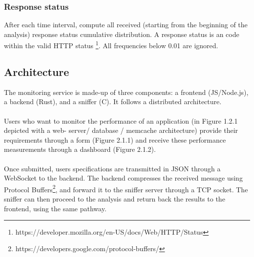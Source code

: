 \documentclass[12pt,hidelinks]{article}
\begin{document}
\subsubsection{Response status}

After each time interval, compute all received (starting from the beginning of the analysis) response status cumulative distribution. 
A response status is an code within the valid HTTP status \footnote{https://developer.mozilla.org/en-US/docs/Web/HTTP/Status}. All frequencies below 0.01 are ignored.


\subsection{Architecture}
	The monitoring service is made-up of three components: a frontend (JS/Node.js), a backend (Rust), and a sniffer (C). It follows a distributed architecture. \\
	\\
	Users who want to monitor the performance of an application (in Figure 1.2.1 depicted with a web-
	server/ database / memcache architecture) provide their requirements through a form (Figure 2.1.1) and 
	receive these performance measurements through a dashboard (Figure 2.1.2).  \\
	\\
	Once submitted, users specifications are transmitted in JSON through a WebSocket to the backend.
	The backend compresses the received message using Protocol Buffers\footnote{https://developers.google.com/protocol-buffers/}, and forward it to the sniffer server through a TCP socket.
	The sniffer can then proceed to the analysis and return back the results to the frontend, using the same pathway.
\end{document}
